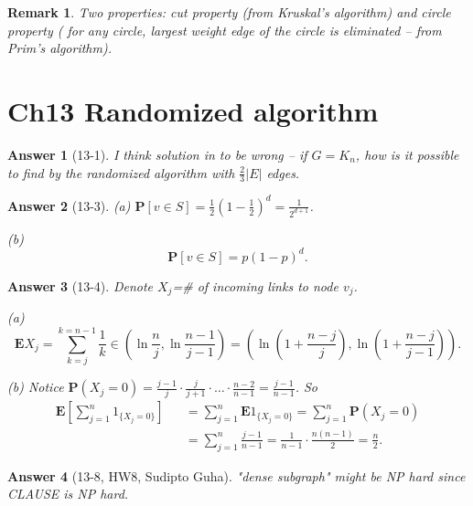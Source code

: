 \documentclass[11pt]{article}
\theoremstyle{numberplain}
\theoremstyle{nonumberplain}
\newtheorem{rem}{Remark}
\newtheorem{ans}{Answer}
\newcommand{\0}{{\mathbf{0}}}
\newcommand{\E}{{\mathbf{E}}}
\renewcommand{\P}{{\mathbf{P}}}
\begin{document}
\begin{rem} Two properties: cut property (from Kruskal's algorithm) and circle property ( for any circle, largest weight edge of the circle is eliminated -- from Prim's algorithm).
\end{rem}

\section{Ch13 Randomized algorithm}
\begin{ans}[13-1] I think solution in \cite{stanford} to be wrong -- if $G=K_n$, how is it possible to find by the randomized algorithm with $\frac{2}{3}|E|$ edges.
\end{ans}

\begin{ans}[13-3] (a)
$
\P[v\in S]=\frac12 \left(1-\frac12 \right)^d=\frac{1}{2^{d+1}}
$.


(b) 
\begin{equation}
\P[v\in S]=p \left(1-p\right)^d.
\label{eq:general p}
\end{equation}
%

\end{ans}

\begin{ans}[13-4] Denote $X_j$=\# of incoming links to node $v_j$.

(a) 
$$\E X_j=\sum_{k=j}^{k=n-1}\frac{1}{k}\in \left(\ln\frac{n}{j},\ln\frac{n-1}{j-1}  \right)=\left(\ln\left(1+\frac{n-j}{j}\right),\ln\left(1+\frac{n-j}{j-1}\right)  \right).$$

(b) Notice $\P\left(X_j=0  \right)=\frac{j-1}{j}\cdot \frac{j}{j+1}\cdot \ldots \cdot \frac{n-2}{n-1}=\frac{j-1}{n-1}$. So 
\begin{eqnarray*}
\E\left[\sum_{j=1}^{n}1_{\{X_j=0\}} \right]&& = \sum_{j=1}^{n}\E 1_{\{X_j=0\}}= \sum_{j=1}^{n}\P (X_j=0)\\
&& =\sum_{j=1}^{n}\frac{j-1}{n-1}=\frac{1}{n-1}\cdot \frac{n(n-1)}{2}=\frac{n}{2}.
\end{eqnarray*}
\end{ans}

\begin{ans}[13-8, HW8, Sudipto Guha]
"dense subgraph" might be NP hard since CLAUSE is NP hard.
\end{ans}
\end{document}
